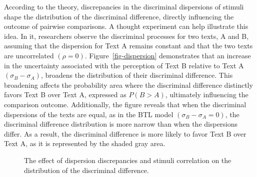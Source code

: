 \documentclass[
  authoryear,
  review,
  1p]{elsarticle}
\begin{document}
According to the theory, discrepancies in the discriminal dispersions of
stimuli shape the distribution of the discriminal difference, directly
influencing the outcome of pairwise comparisons. A thought experiment
can help illustrate this idea. In it, researchers observe the
discriminal processes for two texts, A and B, assuming that the
dispersion for Text A remains constant and that the two texts are
uncorrelated \((\rho=0)\). Figure~\ref{fig-dispersion} demonstrates that
an increase in the uncertainty associated with the perception of Text B
relative to Text A \((\sigma_{B} - \sigma_{A})\), broadens the
distribution of their discriminal difference. This broadening affects
the probability area where the discriminal difference distinctly favors
Text B over Text A, expressed as \(P(B>A)\), ultimately influencing the
comparison outcome. Additionally, the figure reveals that when the
discriminal dispersions of the texts are equal, as in the BTL model
\((\sigma_{B} - \sigma_{A}=0)\), the discriminal difference distribution
is more narrow than when the dispersions differ. As a result, the
discriminal difference is more likely to favor Text B over Text A, as it
is represented by the shaded gray area.

\begin{figure}

\begin{minipage}{0.50\linewidth}



\end{minipage}%
%
\begin{minipage}{0.50\linewidth}



\end{minipage}%

\caption{\label{fig-casev_issues}The effect of dispersion discrepancies
and stimuli correlation on the distribution of the discriminal
difference.}

\end{figure}%
\end{document}
